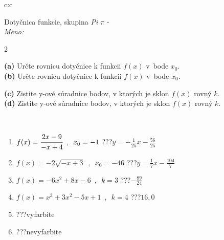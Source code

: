 \documentclass[10pt]{report}
\begin{document}
\begin{tabular}{c:c}
\begin{minipage}[c][104.5mm][t]{0.5\linewidth}
\begin{center}
\vspace{7mm}
{\huge Dotyčnica funkcie, skupina \textit{Pi $\pi$} -}\\[5mm]
\textit{Meno:}\phantom{xxxxxxxxxxxxxxxxxxxxxxxxxxxxxxxxxxxxxxxxxxxxxxxxxxxxxxxxxxxxxxxxx}\\[5mm]
\begin{minipage}{0.95\linewidth}
\begin{center}
{\small \begin{multicols}{2} \raggedright
\textbf{(a)} Určte rovnicu dotyčnice k funkcii \(f(x)\) v~bode \(x_0\). \\[1mm]
\textbf{(b)} Určte rovnicu dotyčnice k funkcii \(f(x)\) v~bode \(x_0\). \par \columnbreak
\textbf{(c)} Zistite y-ové súradnice bodov, v ktorých je sklon \(f(x)\) rovný \(k\). \\[1mm]
\textbf{(d)} Zistite y-ové súradnice bodov, v ktorých je sklon \(f(x)\) rovný \(k\). \\[1mm]
\end{multicols}
}
\end{center}
\end{minipage}
\\[4mm]
\begin{minipage}{0.79\linewidth}
\begin{center}
\begin{varwidth}{\linewidth}
\begin{enumerate}
\normalsizerr
\item $f(x)=\cfrac{2x-9}{-x+4}\enspace , \enspace x_0=-1$\quad \dotfill\; ???\;\dotfill \quad $y = -\frac{1}{25}x-\frac{56}{25}$
\item $f(x)=-2\sqrt{-x+3}\enspace , \enspace x_0=-46$\quad \dotfill\; ???\;\dotfill \quad $y = \frac{1}{7}x-\frac{104}{7}$
\item $f(x)=-6x^2+8x-6\enspace , \enspace k=3$\quad \dotfill\; ???\;\dotfill \quad $-\frac{89}{24}$
\item $f(x)=x^3+3x^2-5x+1\enspace , \enspace k=4$\quad \dotfill\; ???\;\dotfill \quad $16 , 0$
\item \quad \dotfill\; ???\;\dotfill \quad vyfarbite
\item \quad \dotfill\; ???\;\dotfill \quad nevyfarbite
\end{enumerate}
\end{varwidth}

\end{center}
\end{minipage}
\end{center}
\end{minipage}
\end{tabular}
\end{document}

